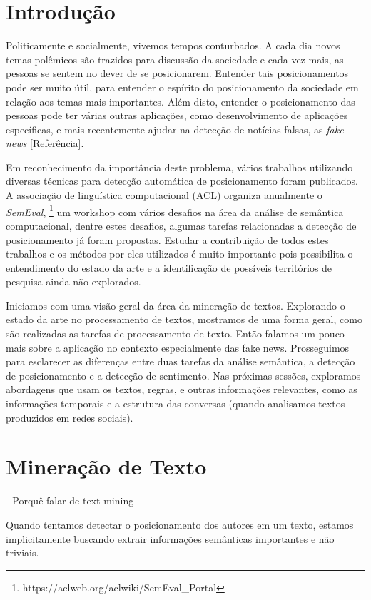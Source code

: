 \section{Introdução}
\quad Politicamente e socialmente, vivemos tempos conturbados. A cada dia
novos temas polêmicos são trazidos para discussão da sociedade e cada
vez mais, as pessoas se sentem no dever de se posicionarem. Entender
tais posicionamentos pode ser muito útil, para entender o espírito do
posicionamento da sociedade em relação aos temas mais importantes.
\quad Além disto, entender o posicionamento das pessoas pode ter
várias outras aplicações, como desenvolvimento de aplicações específicas,
e mais recentemente ajudar na detecção de notícias falsas, as 
\emph{fake news} [Referência].

\quad Em reconhecimento da importância deste problema, vários trabalhos
utilizando diversas técnicas para detecção automática de posicionamento
foram publicados. A associação de linguística computacional (ACL)
organiza anualmente o \emph{SemEval},
\footnote{https://aclweb.org/aclwiki/SemEval\_Portal} um workshop com vários
desafios na área da análise de semântica computacional, dentre estes
desafios, algumas tarefas relacionadas a detecção de posicionamento já
foram propostas. Estudar a contribuição de todos estes trabalhos e os
métodos por eles utilizados é muito importante pois possibilita o
entendimento do estado da arte e a identificação de possíveis
territórios de pesquisa ainda não explorados.

\quad Iniciamos com uma visão geral da área da mineração de textos. Explorando
o estado da arte no processamento de textos, mostramos de uma forma geral,
como são realizadas as tarefas de processamento de texto. Então falamos um
pouco mais sobre a aplicação no contexto especialmente das fake news.
Prosseguimos para esclarecer as diferenças entre duas tarefas da análise 
semântica, a detecção de posicionamento e a detecção de sentimento. Nas
próximas sessões, exploramos abordagens que usam os textos, regras, e outras
informações relevantes, como as informações temporais e a estrutura das
conversas (quando analisamos textos produzidos em redes sociais).

\section{Mineração de Texto}

- Porquê falar de text mining

\quad Quando tentamos detectar o posicionamento dos autores em um texto, estamos
implicitamente buscando extrair informações semânticas importantes e não triviais.

